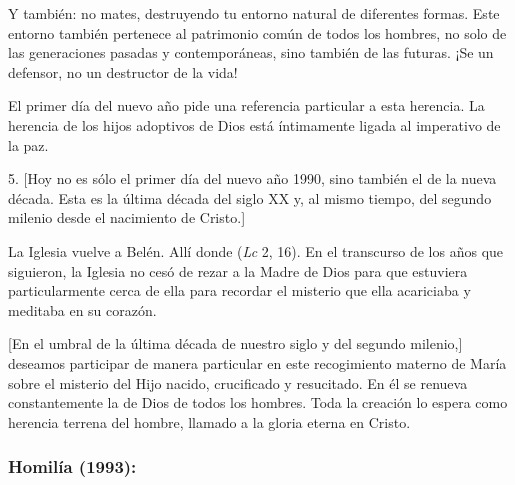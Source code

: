 \begin{body}
	Y también: no mates, destruyendo tu entorno natural de diferentes formas. Este entorno también pertenece al patrimonio común de todos los hombres, no solo de las generaciones pasadas y contemporáneas, sino también de las futuras. ¡Se un defensor, no un destructor de la vida!
	
	El primer día del nuevo año pide una referencia particular a esta herencia. La herencia de los hijos adoptivos de Dios está íntimamente ligada al imperativo de la paz.
	
	5. {[}Hoy no es sólo el primer día del nuevo año 1990, sino también el de la nueva década. Esta es la última década del siglo XX y, al mismo tiempo, del segundo milenio desde el nacimiento de Cristo.{]}
	
	La Iglesia vuelve a Belén. Allí donde  (\emph{Lc} 2, 16). En el transcurso de los años que siguieron, la Iglesia no cesó de rezar a la Madre de Dios para que estuviera particularmente cerca de ella para recordar el misterio que ella acariciaba y meditaba en su corazón.
	
	{[}En el umbral de la última década de nuestro siglo y del segundo milenio,{]} deseamos participar de manera particular en este recogimiento materno de María sobre el misterio del Hijo nacido, crucificado y resucitado. En él se renueva constantemente la  de Dios de todos los hombres. Toda la creación lo espera como herencia terrena del hombre, llamado a la gloria eterna en Cristo.
\end{body}


\subsubsection{Homilía (1993):}


